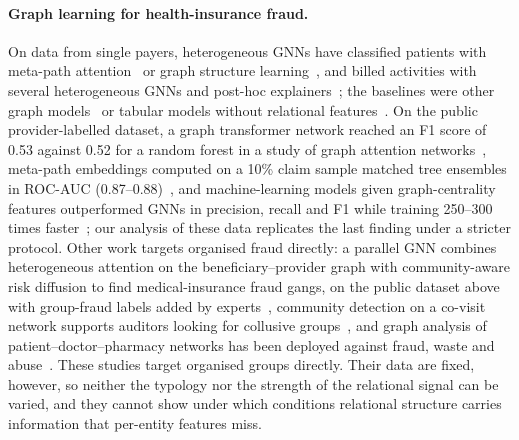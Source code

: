 \documentclass[pdflatex,sn-vancouver-num]{sn-jnl}
\begin{document}
\paragraph{Graph learning for health-insurance fraud.}
On data from single payers, heterogeneous GNNs have classified patients with
meta-path attention~\cite{lu2023} or graph structure
learning~\cite{hong2024}, and billed activities with several heterogeneous
GNNs and post-hoc explainers~\cite{muhammad2025}; the baselines were other
graph models~\cite{lu2023} or tabular models without relational
features~\cite{muhammad2025}. On the public provider-labelled dataset, a graph
transformer network reached an F1 score of 0.53 against 0.52 for a random
forest in a study of graph attention networks~\cite{mardani2024,curtis2025},
meta-path embeddings computed on a 10\% claim sample matched tree ensembles
in ROC-AUC (0.87--0.88)~\cite{mardani2026}, and machine-learning models given
graph-centrality features outperformed GNNs in precision, recall and F1 while
training 250--300 times faster~\cite{yoo2023}; our analysis of these data
replicates the last finding under a stricter protocol. Other work targets
organised fraud directly: a parallel GNN combines heterogeneous attention on
the beneficiary--provider graph with community-aware risk diffusion to find
medical-insurance fraud gangs, on the public dataset above with group-fraud
labels added by experts~\cite{ma2023rdpgl}, community detection on a
co-visit network supports auditors looking for collusive
groups~\cite{zhou2023fraudauditor}, and graph analysis of
patient--doctor--pharmacy networks has been deployed against fraud, waste and
abuse~\cite{liu2016graph}. These studies target organised groups directly.
Their data are fixed, however, so neither the typology nor the
strength of the relational signal can be varied, and they cannot show under
which conditions relational structure carries information that per-entity
features miss.
\end{document}
